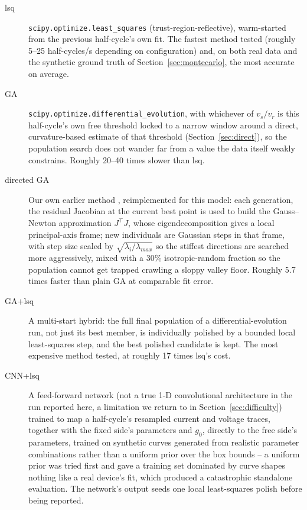 \documentclass[11pt]{article}
\begin{document}
\begin{description}
\item[lsq] \texttt{scipy.optimize.least\_squares} (trust-region-reflective),
  warm-started from the previous half-cycle's own fit. The fastest method
  tested (roughly 5--25 half-cycles/s depending on configuration) and, on
  both real data and the synthetic ground truth of
  Section~\ref{sec:montecarlo}, the most accurate on average.
\item[GA] \texttt{scipy.optimize.differential\_evolution}, with whichever of
  $v_s/v_r$ is this half-cycle's own free threshold locked to a narrow
  window around a direct, curvature-based estimate of that threshold
  (Section~\ref{sec:direct}), so the population search does not wander far
  from a value the data itself weakly constrains. Roughly 20--40 times
  slower than lsq.
\item[directed GA] Our own earlier method \cite{garciamoreno2008directed},
  reimplemented for this model: each generation, the residual Jacobian at
  the current best point is used to build the Gauss--Newton approximation
  $J^\top J$, whose eigendecomposition gives a local principal-axis frame;
  new individuals are Gaussian steps in that frame, with step size scaled by
  $\sqrt{\lambda_i/\lambda_{max}}$ so the stiffest directions are searched
  more aggressively, mixed with a 30\% isotropic-random fraction so the
  population cannot get trapped crawling a sloppy valley floor. Roughly 5.7
  times faster than plain GA at comparable fit error.
\item[GA+lsq] A multi-start hybrid: the full final population of a
  differential-evolution run, not just its best member, is individually
  polished by a bounded local least-squares step, and the best polished
  candidate is kept. The most expensive method tested, at roughly 17 times
  lsq's cost.
\item[CNN+lsq] A feed-forward network (not a true 1-D convolutional
  architecture in the run reported here, a limitation we return to in
  Section~\ref{sec:difficulty}) trained to map a half-cycle's resampled
  current and voltage traces, together with the fixed side's parameters and
  $g_0$, directly to the free side's parameters, trained on synthetic
  curves generated from realistic parameter combinations rather than a
  uniform prior over the box bounds -- a uniform prior was tried first and
  gave a training set dominated by curve shapes nothing like a real
  device's fit, which produced a catastrophic standalone evaluation. The
  network's output seeds one local least-squares polish before being
  reported.
\end{description}
\end{document}
